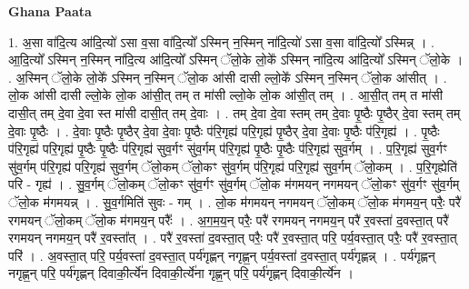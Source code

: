 \documentclass[17pt]{extarticle}
\begin{document}
\textbf{Ghana Paata } \newline

1. अ॒सा वा॑दि॒त्य आ॑दि॒त्यो॑ ऽसा व॒सा वा॑दि॒त्यो᳚ ऽस्मिन् न॒स्मिन् ना॑दि॒त्यो॑ ऽसा व॒सा वा॑दि॒त्यो᳚ ऽस्मिन्न् । . आ॒दि॒त्यो᳚ ऽस्मिन् न॒स्मिन् ना॑दि॒त्य आ॑दि॒त्यो᳚ ऽस्मिन् ॅलो॒के लो॒के᳚ ऽस्मिन् ना॑दि॒त्य आ॑दि॒त्यो᳚ ऽस्मिन् ॅलो॒के । . अ॒स्मिन् ॅलो॒के लो॒के᳚ ऽस्मिन् न॒स्मिन् ॅलो॒क आ॑सी दासी ल्लो॒के᳚ ऽस्मिन् न॒स्मिन् ॅलो॒क आ॑सीत् । . लो॒क आ॑सी दासी ल्लो॒के लो॒क आ॑सी॒त् तम् त मा॑सी ल्लो॒के लो॒क आ॑सी॒त् तम् । . आ॒सी॒त् तम् त मा॑सी दासी॒त् तम् दे॒वा दे॒वा स्त मा॑सी दासी॒त् तम् दे॒वाः । . तम् दे॒वा दे॒वा स्तम् तम् दे॒वाः पृ॒ष्ठैः पृ॒ष्ठैर् दे॒वा स्तम् तम् दे॒वाः पृ॒ष्ठैः । . दे॒वाः पृ॒ष्ठैः पृ॒ष्ठैर् दे॒वा दे॒वाः पृ॒ष्ठैः प॑रि॒गृह्य॑ परि॒गृह्य॑ पृ॒ष्ठैर् दे॒वा दे॒वाः पृ॒ष्ठैः प॑रि॒गृह्य॑ । . पृ॒ष्ठैः प॑रि॒गृह्य॑ परि॒गृह्य॑ पृ॒ष्ठैः पृ॒ष्ठैः प॑रि॒गृह्य॑ सुव॒र्गꣳ सु॑व॒र्गम् प॑रि॒गृह्य॑ पृ॒ष्ठैः पृ॒ष्ठैः प॑रि॒गृह्य॑ सुव॒र्गम् । . प॒रि॒गृह्य॑ सुव॒र्गꣳ सु॑व॒र्गम् प॑रि॒गृह्य॑ परि॒गृह्य॑ सुव॒र्गम् ॅलो॒कम् ॅलो॒कꣳ सु॑व॒र्गम् प॑रि॒गृह्य॑ परि॒गृह्य॑ सुव॒र्गम् ॅलो॒कम् । . प॒रि॒गृह्येति॑ परि - गृह्य॑ । . सु॒व॒र्गम् ॅलो॒कम् ॅलो॒कꣳ सु॑व॒र्गꣳ सु॑व॒र्गम् ॅलो॒क म॑गमयन् नगमयन् ॅलो॒कꣳ सु॑व॒र्गꣳ सु॑व॒र्गम् ॅलो॒क म॑गमयन्न् । . सु॒व॒र्गमिति॑ सुवः - गम् । . लो॒क म॑गमयन् नगमयन् ॅलो॒कम् ॅलो॒क म॑गमय॒न् परैः॒ परै॑ रगमयन् ॅलो॒कम् ॅलो॒क म॑गमय॒न् परैः᳚ । . अ॒ग॒म॒य॒न् परैः॒ परै॑ रगमयन् नगमय॒न् परै॑ र॒वस्ता॑ द॒वस्ता॒त् परै॑ रगमयन् नगमय॒न् परै॑ र॒वस्ता᳚त् । . परै॑ र॒वस्ता॑ द॒वस्ता॒त् परैः॒ परै॑ र॒वस्ता॒त् परि॒ पर्य॒वस्ता॒त् परैः॒ परै॑ र॒वस्ता॒त् परि॑ । . अ॒वस्ता॒त् परि॒ पर्य॒वस्ता॑ द॒वस्ता॒त् पर्य॑गृह्णन् नगृह्ण॒न् पर्य॒वस्ता॑ द॒वस्ता॒त् पर्य॑गृह्णन्न् । . पर्य॑गृह्णन् नगृह्ण॒न् परि॒ पर्य॑गृह्णन् दिवाकी॒र्त्ये॑न दिवाकी॒र्त्ये॑ना गृह्ण॒न् परि॒ पर्य॑गृह्णन् दिवाकी॒र्त्ये॑न । \newline
\end{document}
